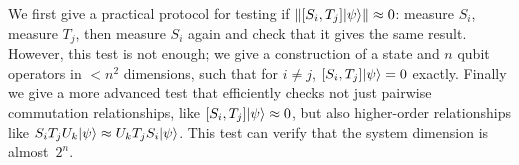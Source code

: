 \documentclass[11pt]{article}
\begin{document}
We first give a practical protocol for testing if ${\| [S_i, T_j] {|\psi\rangle} \|} \approx 0$: measure $S_i$, measure $T_j$, then measure $S_i$ again and check that it gives the same result.  However, this test is not enough; we give a construction of a state and $n$ qubit operators in $< n^2$ dimensions, such that for $i \neq j$, $[S_i, T_j] {|\psi\rangle} = 0$ exactly.  Finally we give a more advanced test that efficiently checks not just pairwise commutation relationships, like $[S_i, T_j] {|\psi\rangle} \approx 0$, but also higher-order relationships like $S_i T_j U_k {|\psi\rangle} \approx U_k T_j S_i {|\psi\rangle}$.  This test can verify that the system dimension is almost~$2^n$.  


\ifx\compilefullpaper\undefined  


\end{document}
